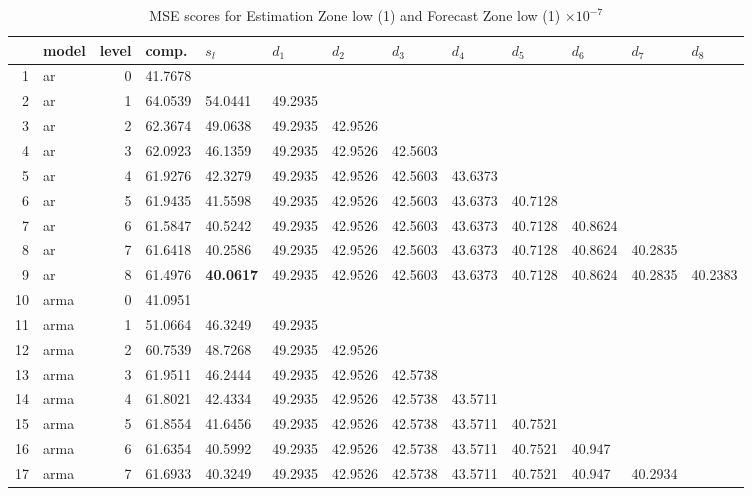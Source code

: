 \documentclass[10pt,a4paper]{article}
\begin{document}
\begin{table}[ht]
\centering
\caption{MSE scores for Estimation Zone low (1) and Forecast Zone low (1) $ \times 10^{-7}$} 
\begin{tabular}{rlrllllllllll}
  \hline
 & model & level & comp. & $s_l$ & $d_1$ & $d_2$ & $d_3$ & $d_4$ & $d_5$ & $d_6$ & $d_7$ & $d_8$ \\ 
  \hline
1 & ar &     0 & 41.7678 &  &  &  &  &  &  &  &  &  \\ 
  2 & ar &     1 & 64.0539 & 54.0441 & 49.2935 &  &  &  &  &  &  &  \\ 
  3 & ar &     2 & 62.3674 & 49.0638 & 49.2935 & 42.9526 &  &  &  &  &  &  \\ 
  4 & ar &     3 & 62.0923 & 46.1359 & 49.2935 & 42.9526 & 42.5603 &  &  &  &  &  \\ 
  5 & ar &     4 & 61.9276 & 42.3279 & 49.2935 & 42.9526 & 42.5603 & 43.6373 &  &  &  &  \\ 
  6 & ar &     5 & 61.9435 & 41.5598 & 49.2935 & 42.9526 & 42.5603 & 43.6373 & 40.7128 &  &  &  \\ 
  7 & ar &     6 & 61.5847 & 40.5242 & 49.2935 & 42.9526 & 42.5603 & 43.6373 & 40.7128 & 40.8624 &  &  \\ 
  8 & ar &     7 & 61.6418 & 40.2586 & 49.2935 & 42.9526 & 42.5603 & 43.6373 & 40.7128 & 40.8624 & 40.2835 &  \\ 
  9 & ar &     8 & 61.4976 & \textbf{40.0617} & 49.2935 & 42.9526 & 42.5603 & 43.6373 & 40.7128 & 40.8624 & 40.2835 & 40.2383 \\ 
   \hline
10 & arma &     0 & 41.0951 &  &  &  &  &  &  &  &  &  \\ 
  11 & arma &     1 & 51.0664 & 46.3249 & 49.2935 &  &  &  &  &  &  &  \\ 
  12 & arma &     2 & 60.7539 & 48.7268 & 49.2935 & 42.9526 &  &  &  &  &  &  \\ 
  13 & arma &     3 & 61.9511 & 46.2444 & 49.2935 & 42.9526 & 42.5738 &  &  &  &  &  \\ 
  14 & arma &     4 & 61.8021 & 42.4334 & 49.2935 & 42.9526 & 42.5738 & 43.5711 &  &  &  &  \\ 
  15 & arma &     5 & 61.8554 & 41.6456 & 49.2935 & 42.9526 & 42.5738 & 43.5711 & 40.7521 &  &  &  \\ 
  16 & arma &     6 & 61.6354 & 40.5992 & 49.2935 & 42.9526 & 42.5738 & 43.5711 & 40.7521 & 40.947 &  &  \\ 
  17 & arma &     7 & 61.6933 & 40.3249 & 49.2935 & 42.9526 & 42.5738 & 43.5711 & 40.7521 & 40.947 & 40.2934 &  \\ 

\end{tabular}
\end{table}
\end{document}
